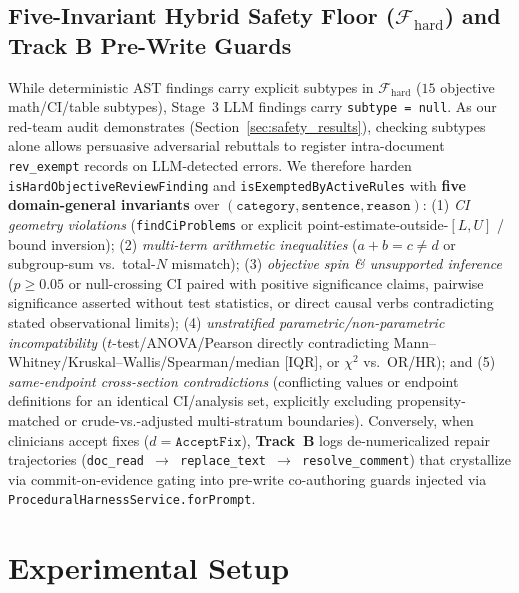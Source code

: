 \documentclass[11pt,a4paper]{article}
\begin{document}
\subsection{Five-Invariant Hybrid Safety Floor (\texorpdfstring{$\mathcal{F}_{\text{hard}}$}{F\_hard}) and Track B Pre-Write Guards}
While deterministic AST findings carry explicit subtypes in $\mathcal{F}_{\text{hard}}$ ($15$ objective math/CI/table subtypes), Stage~3 LLM findings carry \texttt{subtype = null}. As our red-team audit demonstrates (Section~\ref{sec:safety_results}), checking subtypes alone allows persuasive adversarial rebuttals to register intra-document \texttt{rev\_exempt} records on LLM-detected errors. We therefore harden \texttt{isHardObjectiveReviewFinding} and \texttt{isExemptedByActiveRules} with \textbf{five domain-general invariants} over $(\texttt{category}, \texttt{sentence}, \texttt{reason})$: (1) \emph{CI geometry violations} (\texttt{findCiProblems} or explicit point-estimate-outside-$[L,U]$ / bound inversion); (2) \emph{multi-term arithmetic inequalities} ($a + b = c \neq d$ or subgroup-sum vs.\ total-$N$ mismatch); (3) \emph{objective spin \& unsupported inference} ($p \ge 0.05$ or null-crossing CI paired with positive significance claims, pairwise significance asserted without test statistics, or direct causal verbs contradicting stated observational limits); (4) \emph{unstratified parametric/non-parametric incompatibility} ($t$-test/ANOVA/Pearson directly contradicting Mann--Whitney/Kruskal--Wallis/Spearman/median [IQR], or $\chi^2$ vs.\ OR/HR); and (5) \emph{same-endpoint cross-section contradictions} (conflicting values or endpoint definitions for an identical CI/analysis set, explicitly excluding propensity-matched or crude-vs.-adjusted multi-stratum boundaries). Conversely, when clinicians accept fixes ($d = \texttt{AcceptFix}$), \textbf{Track~B} logs de-numericalized repair trajectories (\texttt{doc\_read $\to$ replace\_text $\to$ resolve\_comment}) that crystallize via commit-on-evidence gating \cite{coem2026} into pre-write co-authoring guards injected via \texttt{ProceduralHarnessService.forPrompt}.

\section{Experimental Setup}
\label{sec:setup}
\end{document}
